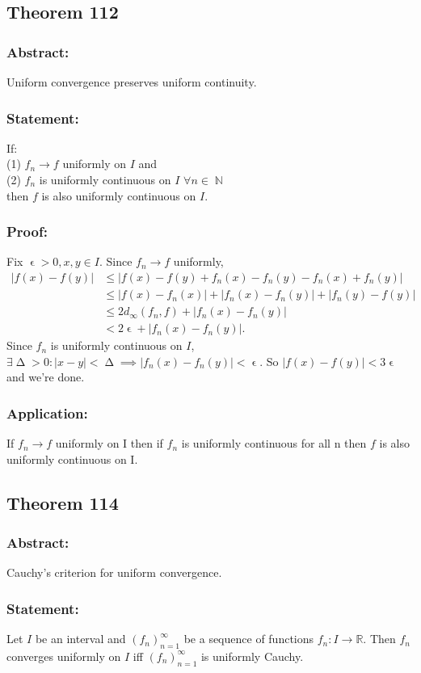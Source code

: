 \documentclass{article}
\DeclareMathOperator\eps{\epsilon}
\DeclareMathOperator\Del{\Delta}
\DeclareMathOperator\N{\mathbb{N}}
\begin{document}
\subsection{Theorem 112}
\subsubsection*{Abstract:}
Uniform convergence preserves uniform continuity.
\subsubsection*{Statement:}
If: \\
\newline
(1) $f_n \to f$ uniformly on $I$ and \\
\newline
(2) $f_n$ is uniformly continuous on $I$ $\forall n \in \N$ \\
\newline
then $f$ is also uniformly continuous on $I$.
\subsubsection*{Proof:}
Fix $\eps>0, x,y \in I$. Since $f_n \to f$ uniformly,
\begin{align*}
|f(x)-f(y)| &\leq |f(x)-f(y)+f_n(x)-f_n(y)-f_n(x)+f_n(y)| \\
& \leq |f(x)-f_n(x)|+|f_n(x)-f_n(y)|+|f_n(y)-f(y)| \\
& \leq 2d_{\infty}(f_n,f)+|f_n(x)-f_n(y)| \\
& < 2 \eps + |f_n(x)-f_n(y)|.
\end{align*}
Since $f_n$ is uniformly continuous on $I$, $\exists \Del>0:|x-y|< \Del \implies |f_n(x)-f_n(y)| < \eps$.
So $|f(x)-f(y)| < 3\eps$ and we're done.
\subsubsection*{Application:}
If $f_n \to f$ uniformly on I then if $f_n$ is uniformly continuous for all n then
$f$ is also uniformly continuous on I.
\subsection{Theorem 114}
\subsubsection*{Abstract:}
Cauchy's criterion for uniform convergence.
\subsubsection*{Statement:}
Let $I$ be an interval and $(f_n)_{n=1}^{\infty}$
be a sequence of functions $f_n: I \to \mathbb{R}$. Then $f_n$ converges uniformly on $I$
iff $(f_n)_{n=1}^{\infty}$ is uniformly Cauchy.
\end{document}
